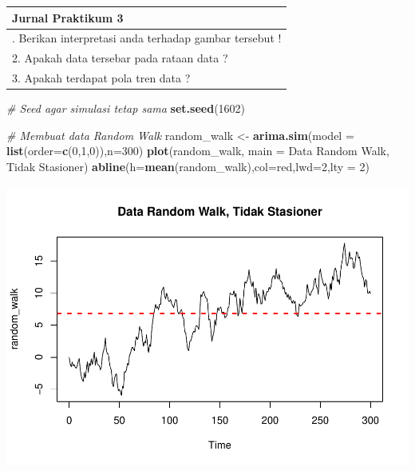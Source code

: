 \documentclass[
]{book}
\newenvironment{Shaded}{\begin{snugshade}}{\end{snugshade}}
\newcommand{\AttributeTok}[1]{\textcolor[rgb]{0.13,0.29,0.53}{#1}}
\newcommand{\CommentTok}[1]{\textcolor[rgb]{0.56,0.35,0.01}{\textit{#1}}}
\newcommand{\DecValTok}[1]{\textcolor[rgb]{0.00,0.00,0.81}{#1}}
\newcommand{\FunctionTok}[1]{\textcolor[rgb]{0.13,0.29,0.53}{\textbf{#1}}}
\newcommand{\NormalTok}[1]{#1}
\newcommand{\OtherTok}[1]{\textcolor[rgb]{0.56,0.35,0.01}{#1}}
\newcommand{\StringTok}[1]{\textcolor[rgb]{0.31,0.60,0.02}{#1}}
\begin{document}
\begin{longtable}[]{@{}l@{}}
\toprule\noalign{}
Jurnal Praktikum 3 \\
\midrule\noalign{}
\endhead
\bottomrule\noalign{}
\endlastfoot
1. Berikan interpretasi anda terhadap gambar tersebut ! \\
2. Apakah data tersebar pada rataan data ? \\
3. Apakah terdapat pola tren data ? \\
\end{longtable}

\begin{Shaded}
\begin{Highlighting}[]
\CommentTok{\# Seed agar simulasi tetap sama}
\FunctionTok{set.seed}\NormalTok{(}\DecValTok{1602}\NormalTok{)}

\CommentTok{\# Membuat data Random Walk}
\NormalTok{random\_walk }\OtherTok{\textless{}{-}} \FunctionTok{arima.sim}\NormalTok{(}\AttributeTok{model =} \FunctionTok{list}\NormalTok{(}\AttributeTok{order=}\FunctionTok{c}\NormalTok{(}\DecValTok{0}\NormalTok{,}\DecValTok{1}\NormalTok{,}\DecValTok{0}\NormalTok{)),}\AttributeTok{n=}\DecValTok{300}\NormalTok{)}
\FunctionTok{plot}\NormalTok{(random\_walk, }\AttributeTok{main =} \StringTok{\textquotesingle{}Data Random Walk, Tidak Stasioner\textquotesingle{}}\NormalTok{)}
\FunctionTok{abline}\NormalTok{(}\AttributeTok{h=}\FunctionTok{mean}\NormalTok{(random\_walk),}\AttributeTok{col=}\StringTok{\textquotesingle{}red\textquotesingle{}}\NormalTok{,}\AttributeTok{lwd=}\DecValTok{2}\NormalTok{,}\AttributeTok{lty =} \DecValTok{2}\NormalTok{)}
\end{Highlighting}
\end{Shaded}

\begin{center}\includegraphics{_main_files/figure-latex/Contoh Plot yang Stasioner a Tidak Stasioner-1} \end{center}
\end{document}

